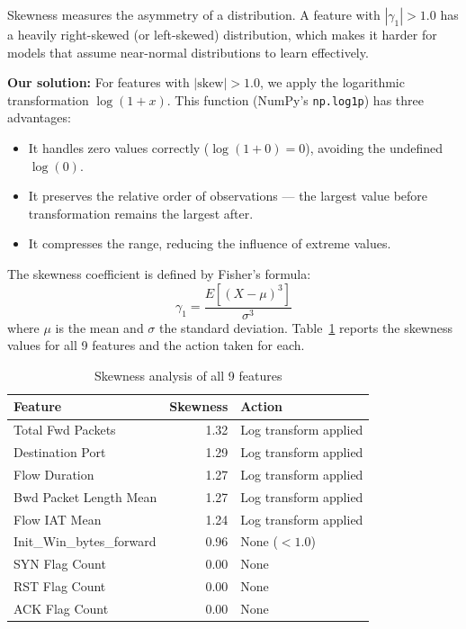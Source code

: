 Skewness measures the asymmetry of a distribution. A feature with $|\gamma_1| > 1.0$ has a heavily right-skewed (or left-skewed) distribution, which makes it harder for models that assume near-normal distributions to learn effectively.

\textbf{Our solution:} For features with $|\text{skew}| > 1.0$, we apply the logarithmic transformation $\log(1 + x)$. This function (NumPy's \texttt{np.log1p}) has three advantages:
\begin{itemize}
    \item It handles zero values correctly ($\log(1 + 0) = 0$), avoiding the undefined $\log(0)$.
    \item It preserves the relative order of observations --- the largest value before transformation remains the largest after.
    \item It compresses the range, reducing the influence of extreme values.
\end{itemize}

The skewness coefficient is defined by Fisher's formula:
\begin{equation}
    \gamma_1 = \frac{E[(X - \mu)^3]}{\sigma^3}
\end{equation}
where $\mu$ is the mean and $\sigma$ the standard deviation. Table~\ref{tab:skewness} reports the skewness values for all 9 features and the action taken for each.

\begin{table}[H]
\centering
\caption{Skewness analysis of all 9 features}
\label{tab:skewness}
\begin{tabular}{lrl}
\toprule
\textbf{Feature} & \textbf{Skewness} & \textbf{Action} \\
\midrule
Total Fwd Packets & 1.32 & Log transform applied \\
Destination Port & 1.29 & Log transform applied \\
Flow Duration & 1.27 & Log transform applied \\
Bwd Packet Length Mean & 1.27 & Log transform applied \\
Flow IAT Mean & 1.24 & Log transform applied \\
Init\_Win\_bytes\_forward & 0.96 & None ($< 1.0$) \\
SYN Flag Count & 0.00 & None \\
RST Flag Count & 0.00 & None \\
ACK Flag Count & 0.00 & None \\
\bottomrule
\end{tabular}
\end{table}

